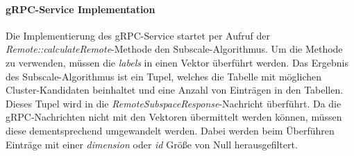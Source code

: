 \paragraph{gRPC-Service Implementation}
Die Implementierung des gRPC-Service startet per Aufruf der \textit{Remote::calculateRemote}-Methode den
Subscale-Algorithmus. Um die Methode zu verwenden, müssen die \textit{labels} in einen Vektor überführt werden. Das
Ergebnis des Subscale-Algorithmus ist ein Tupel, welches die Tabelle mit möglichen Cluster-Kandidaten beinhaltet und
eine Anzahl von Einträgen in den Tabellen. Dieses Tupel wird in die \textit{RemoteSubspaceResponse}-Nachricht überführt.
Da die gRPC-Nachrichten nicht mit den Vektoren übermittelt werden können, müssen diese dementsprechend umgewandelt
werden. Dabei werden beim Überführen Einträge mit einer \textit{dimension} oder \textit{id} Größe von Null
herausgefiltert.

